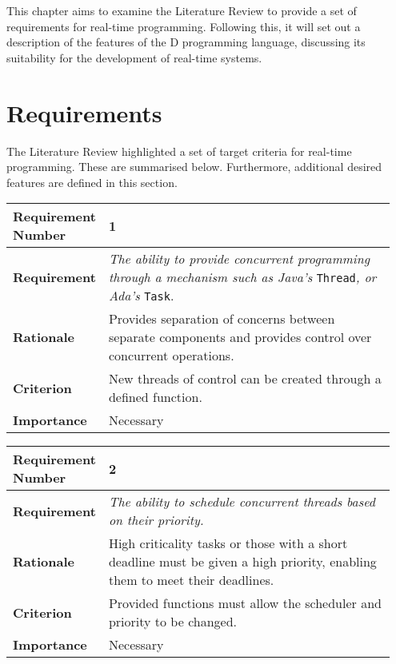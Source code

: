 
This chapter aims to examine the Literature Review to provide a set of 
requirements for real-time programming. Following this, it will set out a 
description of the features of the D programming language, discussing its 
suitability for the development of real-time systems.

\section{Requirements}
The Literature Review highlighted a set of target criteria for real-time 
programming. These are summarised below. Furthermore, additional desired features 
are defined in this section. 
\begin{table}[!h]
\centering
\begin{tabular}{|L{0.2\linewidth}|L{0.75\linewidth}|}
\hline
\textbf{Requirement Number} & 1 \\ \hline
\textbf{Requirement} & \emph{The ability to provide concurrent programming through a 
mechanism such as Java's} \texttt{Thread}\emph{, or Ada's} \texttt{Task}. \\ \hline
\textbf{Rationale}      & Provides separation of concerns between separate components
and provides control over concurrent operations. \\ \hline
\textbf{Criterion}      & New threads of control can be created through a defined 
function. \\ \hline
\textbf{Importance}     & Necessary \\ \hline
\end{tabular}
\end{table}
\begin{table}[!h]
\centering
\begin{tabular}{|L{0.2\linewidth}|L{0.75\linewidth}|}
\hline
\textbf{Requirement Number} & 2 \\ \hline
\textbf{Requirement} & \emph{The ability to schedule concurrent threads based on 
                their priority.}\\ \hline
\textbf{Rationale}      & High criticality tasks or those with a short deadline
                must be given a high priority, enabling them to meet their 
                deadlines. \\ \hline
\textbf{Criterion}      & Provided functions must allow the scheduler and
                priority to be changed. \\ \hline
\textbf{Importance}     & Necessary \\ \hline
\end{tabular}
\end{table}
